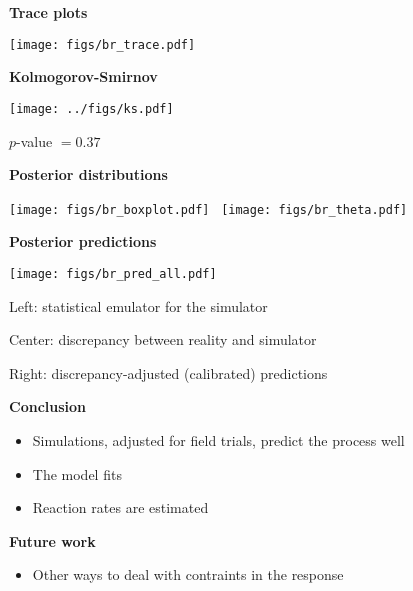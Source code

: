 \documentclass[mathserif, 11pt, t]{beamer}
\renewcommand{\subtitle}[1]{\vspace{0.45cm}\textcolor{bluegreen}{
    {\textbf{#1}}}\vspace{0.15cm}\newline}
\begin{document}
\begin{frame}
\subtitle{Trace plots}
\vspace{-0.5cm}
\begin{center}
\texttt{[image: figs/br\_trace.pdf]}
\end{center}
\end{frame}

\begin{frame}
\subtitle{Kolmogorov-Smirnov}
\begin{center}
\texttt{[image: ../figs/ks.pdf]}

$p$-value $=0.37$
\end{center}
\end{frame}

\begin{frame}
\subtitle{Posterior distributions}
\begin{center}
\texttt{[image: figs/br\_boxplot.pdf]}~
\texttt{[image: figs/br\_theta.pdf]}
\end{center}
\end{frame}

\begin{frame}
\subtitle{Posterior predictions}
\vspace{-1.0cm}
\begin{center}
\texttt{[image: figs/br\_pred\_all.pdf]}
\end{center}
Left: statistical emulator for the simulator

Center: discrepancy between reality and simulator

Right: discrepancy-adjusted (calibrated) predictions

\end{frame}

\begin{frame}
\subtitle{Conclusion}
\vspace{-0.5cm}
\begin{itemize}[label={$\cdot$}]
\item Simulations, adjusted for field trials, predict the process well
\item The model fits
\item Reaction rates are estimated
\end{itemize}

\subtitle{Future work}
\vspace{-0.5cm}
\begin{itemize}[label={$\cdot$}]
\item Other ways to deal with contraints in the response
\end{itemize}
\end{frame}
\end{document}
